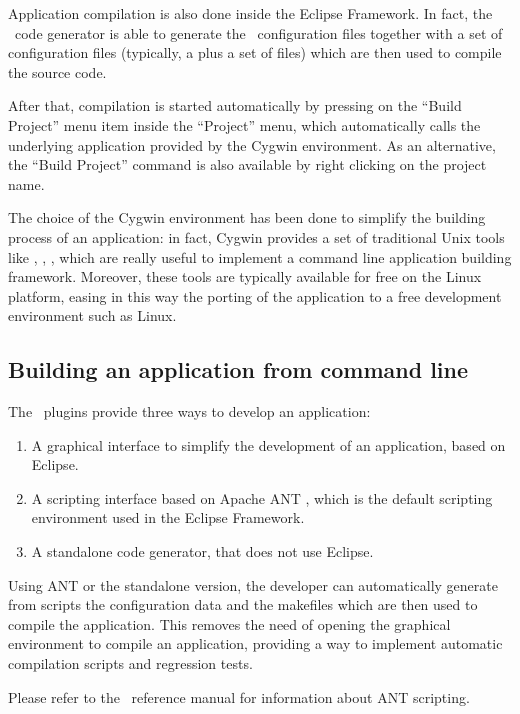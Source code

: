 Application compilation is also done inside the Eclipse Framework. In
fact, the \rtd\ code generator is able to generate the \ee\
configuration files together with a set of configuration files
(typically, a  plus a set of  files) which are
then used to compile the source code.

After that, compilation is started automatically by pressing on the
``Build Project'' menu item inside the ``Project'' menu, which
automatically calls the underlying  application provided by
the Cygwin environment. As an alternative, the ``Build Project''
command is also available by right clicking on the project name.

The choice of the Cygwin environment has been done to simplify the
building process of an application: in fact, Cygwin provides a set of
traditional Unix tools like \file{make}, \file{awk}, \file{sed}, which
are really useful to implement a command line application building
framework. Moreover, these tools are typically available for free on
the Linux platform, easing in this way the porting of the application
to a free development environment such as Linux.


\subsection{Building an application from command line}
The \rtd\ plugins provide three ways to develop an application:
\begin{enumerate}
\item A graphical interface to simplify the development of an
  application, based on Eclipse.
\item A scripting interface based on Apache ANT \cite{ANT}, which is
  the default scripting environment used in the Eclipse Framework.
\item A standalone code generator, that does not use Eclipse.
\end{enumerate}

Using ANT or the standalone version, the developer can automatically
generate from scripts the configuration data and the makefiles which
are then used to compile the application. This removes the need of
opening the graphical environment to compile an application, providing
a way to implement automatic compilation scripts and regression tests.

Please refer to the \rtd\ reference manual for information about ANT
scripting.



